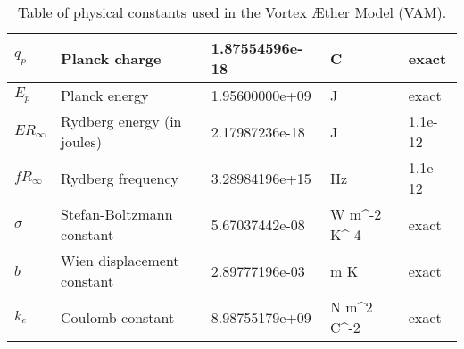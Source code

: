 \documentclass{article}%
\begin{document}
\begin{table}[H]
\begin{tabular}{|p{1.5cm}|p{6cm}|p{2.5cm}|p{2cm}|p{2cm}|}
        $q_p$ & Planck charge & 1.87554596e-18 & C & exact \\ \hline%
        $E_p$ & Planck energy & 1.95600000e+09 & J & exact \\ \hline%
        $ER_\infty$ & Rydberg energy (in joules) & 2.17987236e-18 & J & 1.1e-12 \\ \hline%
        $fR_\infty$ & Rydberg frequency & 3.28984196e+15 & Hz & 1.1e-12 \\ \hline%
        $\sigma$ & Stefan-Boltzmann constant & 5.67037442e-08 & W m^-2 K^-4 & exact \\ \hline%
        $b$ & Wien displacement constant & 2.89777196e-03 & m K & exact \\ \hline%
        $k_e$ & Coulomb constant & 8.98755179e+09 & N m^2 C^-2 & exact \\ \hline%

    \end{tabular}
    \caption{Table of physical constants used in the Vortex Æther Model (VAM).}
    \label{tab:physical_constants}
\end{table}
%
\small%
\end{document}
